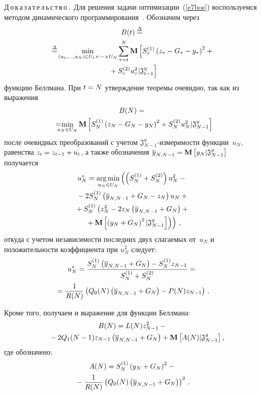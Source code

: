 \begin{multicols}{2}
  \noindent
  Д\,о\,к\,а\,з\,а\,т\,е\,л\,ь\,с\,т\,в\,о\,.\ Для решения задачи оптимизации~(\ref{e7bos}) 
воспользуемся методом динамического программирования~\cite{6bos, 5bos}. Обозначим 
через
    \begin{multline*}
    B(t) \overset{\Delta}{=}{}\\
\hspace*{-1pt}  {}\overset{\Delta}{=}\!   \min\limits_{(u_t,\ldots ,u_N)\in U_t\times\cdots \times
  U_N} \sum\limits_{\tau=t}^N \mathbf{M}\left[ S_\tau^{(1)}\left( z_\tau-G_\tau-
y_\tau\right)^2+{}\right.\\
  \left.{}+ S_\tau^{(2)}u_\tau^2\vert \mathfrak{J}^y_{t-1}\right]
  \end{multline*}
функцию Беллмана. При $t\hm= N$ утверждение теоремы очевидно, так как из выражения
\begin{multline*}
B(N) ={}\\
{}=\!\!\!\!\!\min\limits_{u_N\in U_N}\mathbf{M}\left[ S_N^{(1)}\left( z_N-G_N-
y_N\right)^2+
S_N^{(2)} u_N^2\vert \mathfrak{J}^y_{N-1}\right]\hspace*{-1.01462pt}
\end{multline*}
после очевидных преобразований с учетом $\mathfrak{J}^y_{N-1}$-из\-ме\-ри\-мости 
функции~$u_N$, равенства $z_t\hm= z_{t-1}\hm+u_t$, а также обозначения 
$\overline{y}_{N,N-1}\hm=\mathbf{M}\left[ y_N\vert \mathfrak{J}^y_{N-1}\right]$ получается
\begin{multline*}
u_N^* =\mathop{\mathrm{arg}\,\mathrm{min}}\limits_{u_N\in U_N}\left(\left( S_N^{(1)}+S_N^{(2)}\right) u_N^2-{}\right.\\
{}-2S_N^{(1)}\left( \overline{y}_{N,N-1}+G_N-z_N\right) u_N+{}\\
{}+ S_N^{(1)}\left( z_N^2-2z_N\left( \overline{y}_{N,N-1}+G_N\right) +{}\right.\\
\left.\left.{}+\mathbf{M}
\left[ \left( y_N+G_N\right)^2\vert \mathfrak{J}^y_{N-1}\right] \right) \right)\,,
\end{multline*}
откуда с учетом независимости последних двух слагаемых от~$u_N$ и положительности 
коэффициента при $u_N^2$ следует:
\begin{multline*}
u_N^*= \displaystyle\frac{\displaystyle S_N^{(1)}\left(\overline{y}_{N,N-1}+G_N\right) -S_N^{(1)} z_{N-
1}\mathstrut}{\displaystyle S_N^{(1)}+S_N^{(2)}\mathstrut} ={}\\
{}=\displaystyle\frac{\displaystyle 1\mathstrut}{\displaystyle R(N)\mathstrut}\left( Q_0(N) \left( \overline{y}_{N,N-1} +G_N\right) -P(N) z_{N-1}\right)\,.
\end{multline*}
  
  Кроме того, получаем и выражение для функции Беллмана:
  \begin{multline*}
  B(N) = L(N) z^2_{N-1} -{}\\
  {}-2Q_1(N-1) z_{N-1}\left( \overline{y}_{N,N-1} +G_N\right) 
+\mathbf{M} \left[ A(N) \vert \mathfrak{J}^y_{N-1}\right],\hspace*{-10.4206pt}
  \end{multline*}
где обозначено:
\begin{multline*}
A(N) =S_N^{(1)} \left( y_N+G_N\right)^2 -{}\\
{}-\displaystyle\frac{\displaystyle 1\mathstrut}{\displaystyle R(N)\mathstrut} \left( Q_0(N) \left( \overline{y}_{N,N-
1} +G_N\right)\right)^2\,.
\end{multline*}
  

\end{multicols}
